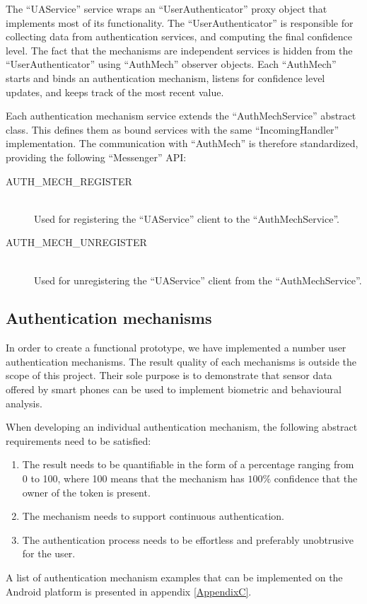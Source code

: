 The ``UAService'' service wraps an ``UserAuthenticator'' proxy object that implements most of its functionality. The ``UserAuthenticator'' is responsible for collecting data from authentication services, and computing the final confidence level. The fact that the mechanisms are independent services is hidden from the ``UserAuthenticator'' using ``AuthMech'' observer objects. Each ``AuthMech'' starts and binds an authentication mechanism, listens for confidence level updates, and keeps track of the most recent value.
 
Each authentication mechanism service extends the ``AuthMechService'' abstract class. This defines them as bound services with the same ``IncomingHandler'' implementation. The communication with ``AuthMech'' is therefore standardized, providing the following ``Messenger'' API:
\begin{description}
  \item[AUTH\_MECH\_REGISTER] \hfill \\
  Used for registering the ``UAService'' client to the ``AuthMechService''.
  
  \item[AUTH\_MECH\_UNREGISTER] \hfill \\
  Used for unregistering the ``UAService'' client from the ``AuthMechService''.
\end{description}    

  
\subsection{Authentication mechanisms}
\label{implauthmech}

In order to create a functional prototype, we have implemented a number user authentication mechanisms. The result quality of each mechanisms is outside the scope of this project. Their sole purpose is to demonstrate that sensor data offered by smart phones can be used to implement biometric and behavioural analysis.

When developing an individual authentication mechanism, the following abstract requirements need to be satisfied: 
\begin{enumerate}
	\item The result needs to be quantifiable in the form of a percentage ranging from 0 to 100, where 100 means that the mechanism has $100\%$ confidence that the owner of the token is present.
	\item The mechanism needs to support continuous authentication.
	\item The authentication process needs to be effortless and preferably unobtrusive for the user.
\end{enumerate}
A list of authentication mechanism examples that can be implemented on the Android platform is presented in appendix \ref{AppendixC}.

